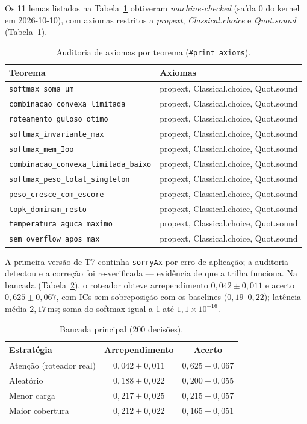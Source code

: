 \documentclass[12pt,a4paper]{article}
\begin{document}
Os 11 lemas listados na Tabela~\ref{tab:ax} obtiveram \textit{machine-checked} (saída 0 do kernel em 2026-10-10),
com axiomas restritos a \textit{propext}, \textit{Classical.choice} e
\textit{Quot.sound} (Tabela~\ref{tab:ax}).
\begin{table}[h]
\centering
\caption{Auditoria de axiomas por teorema (\texttt{\#print axioms}).}
\label{tab:ax}
\begin{tabular}{ll}
\toprule
Teorema & Axiomas \\
\midrule
\texttt{softmax\_soma\_um} & propext, Classical.choice, Quot.sound \\
\texttt{combinacao\_convexa\_limitada} & propext, Classical.choice, Quot.sound \\
\texttt{roteamento\_guloso\_otimo} & propext, Classical.choice, Quot.sound \\
\texttt{softmax\_invariante\_max} & propext, Classical.choice, Quot.sound \\
\texttt{softmax\_mem\_Ioo} & propext, Classical.choice, Quot.sound \\
\texttt{combinacao\_convexa\_limitada\_baixo} & propext, Classical.choice, Quot.sound \\
\texttt{softmax\_peso\_total\_singleton} & propext, Classical.choice, Quot.sound \\
\texttt{peso\_cresce\_com\_escore} & propext, Classical.choice, Quot.sound \\
\texttt{topk\_dominam\_resto} & propext, Classical.choice, Quot.sound \\
\texttt{temperatura\_aguca\_maximo} & propext, Classical.choice, Quot.sound \\
\texttt{sem\_overflow\_apos\_max} & propext, Classical.choice, Quot.sound \\
\bottomrule
\end{tabular}
\end{table}
A primeira versão de T7 continha \texttt{sorryAx} por erro de aplicação; a
auditoria detectou e a correção foi re-verificada --- evidência de que a
trilha funciona. Na bancada (Tabela~\ref{tab:bench}), o roteador obteve
arrependimento $0{,}042\pm0{,}011$ e acerto $0{,}625\pm0{,}067$, com ICs sem
sobreposição com os baselines ($0{,}19$--$0{,}22$); latência média $2{,}17$\,ms;
soma do softmax igual a 1 até $1{,}1\times10^{-16}$.
\begin{table}[h]
\centering
\caption{Bancada principal (200 decisões).}
\label{tab:bench}
\begin{tabular}{lcc}
\toprule
Estratégia & Arrependimento & Acerto \\
\midrule
Atenção (roteador real) & $0{,}042\pm0{,}011$ & $0{,}625\pm0{,}067$ \\
Aleatório & $0{,}188\pm0{,}022$ & $0{,}200\pm0{,}055$ \\
Menor carga & $0{,}217\pm0{,}025$ & $0{,}215\pm0{,}057$ \\
Maior cobertura & $0{,}212\pm0{,}022$ & $0{,}165\pm0{,}051$ \\
\bottomrule
\end{tabular}
\end{table}
\end{document}
